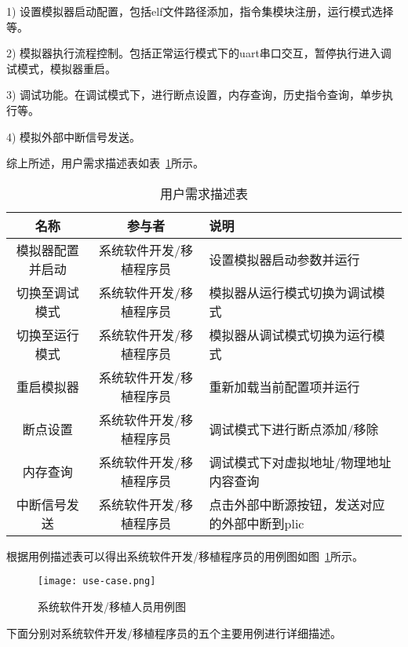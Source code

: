 1) 设置模拟器启动配置，包括elf文件路径添加，指令集模块注册，运行模式选择等。


2) 模拟器执行流程控制。包括正常运行模式下的uart串口交互，暂停执行进入调试模式，模拟器重启。


3) 调试功能。在调试模式下，进行断点设置，内存查询，历史指令查询，单步执行等。


4) 模拟外部中断信号发送。


综上所述，用户需求描述表如表~\ref{tab:tab1}所示。
\begin{table}[H]
  \centering
  \caption{用户需求描述表}
  \label{tab:tab1}
  \renewcommand\arraystretch{1.2}
  \begin{tabular}{ccl}
    \toprule
    名称   & 参与者   & 说明   \\
    \midrule
    模拟器配置并启动 & 系统软件开发/移植程序员 & \multicolumn{1}{p{5cm}}{设置模拟器启动参数并运行} \\ \hline
    切换至调试模式 &	系统软件开发/移植程序员	& \multicolumn{1}{m{5cm}}{模拟器从运行模式切换为调试模式}\\
    \hline
    切换至运行模式 & 系统软件开发/移植程序员	& \multicolumn{1}{m{5cm}}{模拟器从调试模式切换为运行模式}\\
    \hline
    重启模拟器	& 系统软件开发/移植程序员	& \multicolumn{1}{p{5cm}}{重新加载当前配置项并运行}\\
    \hline
    断点设置 &	系统软件开发/移植程序员 &	\multicolumn{1}{p{5cm}}{调试模式下进行断点添加/移除}\\
    \hline
    内存查询 &	系统软件开发/移植程序员 &	\multicolumn{1}{m{5cm}}{调试模式下对虚拟地址/物理地址内容查询}\\
    \hline
    中断信号发送	& 系统软件开发/移植程序员 &	\multicolumn{1}{m{5cm}}{点击外部中断源按钮，发送对应的外部中断到plic}\\
    \bottomrule
  \end{tabular}
\end{table}


根据用例描述表可以得出系统软件开发/移植程序员的用例图如图~\ref{fig:use-case}所示。
\begin{figure}[H]
  \centering
  \texttt{[image: use-case.png]}
  \caption{系统软件开发/移植人员用例图}
  \label{fig:use-case}
\end{figure}


下面分别对系统软件开发/移植程序员的五个主要用例进行详细描述。 


